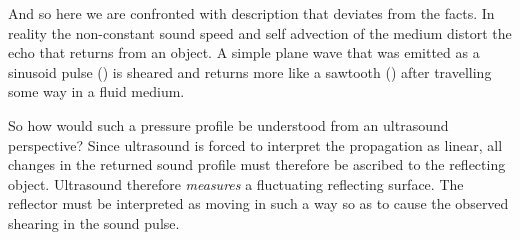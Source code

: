 And so here we are confronted with description that deviates from the facts.
In reality the non-constant sound speed and self advection of the medium distort the echo that returns from an object.
%
A simple plane wave that was emitted as a sinusoid pulse () is sheared and returns more like a sawtooth () after travelling some way in a fluid medium.

So how would such a pressure profile be understood from an ultrasound perspective?
Since ultrasound is forced to interpret the propagation as linear,
all changes in the returned sound profile must therefore be ascribed to the reflecting object. %
Ultrasound  therefore  {\em measures} a fluctuating reflecting surface.
The reflector must be interpreted as moving in such a way so as to cause the observed shearing in the sound pulse.

